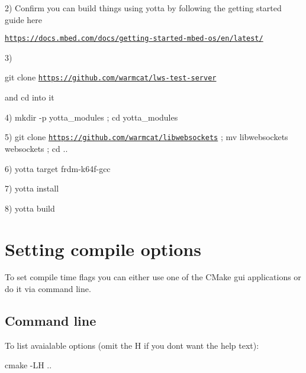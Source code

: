 2) Confirm you can build things using yotta by following the getting started guide here

\href{https://docs.mbed.com/docs/getting-started-mbed-os/en/latest/}{\tt https\+://docs.\+mbed.\+com/docs/getting-\/started-\/mbed-\/os/en/latest/}

3)

git clone \href{https://github.com/warmcat/lws-test-server}{\tt https\+://github.\+com/warmcat/lws-\/test-\/server}

and cd into it

4) mkdir -\/p yotta\+\_\+modules ; cd yotta\+\_\+modules

5) git clone \href{https://github.com/warmcat/libwebsockets}{\tt https\+://github.\+com/warmcat/libwebsockets} ; mv libwebsockets websockets ; cd ..

6) yotta target frdm-\/k64f-\/gcc

7) yotta install

8) yotta build\hypertarget{md_README.build_cmco}{}\section{Setting compile options}\label{md_README.build_cmco}
To set compile time flags you can either use one of the C\+Make gui applications or do it via command line.\hypertarget{md_README.build_cmcocl}{}\subsection{Command line}\label{md_README.build_cmcocl}
To list avaialable options (omit the H if you don\textquotesingle{}t want the help text)\+: \begin{DoxyVerb}    cmake -LH ..
\end{DoxyVerb}


